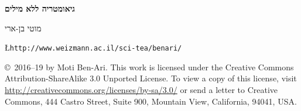 \documentclass[12pt]{article}
\begin{document}
\thispagestyle{empty}

\begin{center}
\begin{Huge}
\textbf{גיאומטריה ללא מילים}
\end{Huge}

\bigskip

\LARGE מוטי בן-ארי

\medskip

\L{\texttt{http://www.weizmann.ac.il/sci-tea/benari/}}

\bigskip


\begin{minipage}{15cm}
\baselineskip=18pt
\begin{small}
\copyright{}\  2016--19 by Moti Ben-Ari.
This work is licensed under the Creative Commons Attribution-ShareAlike 3.0 Unported License. To view a copy of this license, visit \url{http://creativecommons.org/licenses/by-sa/3.0/} or send a letter to Creative Commons, 444 Castro Street, Suite 900, Mountain View, California, 94041, USA.
\end{small}
\end{minipage}
\end{center}

\end{document}
